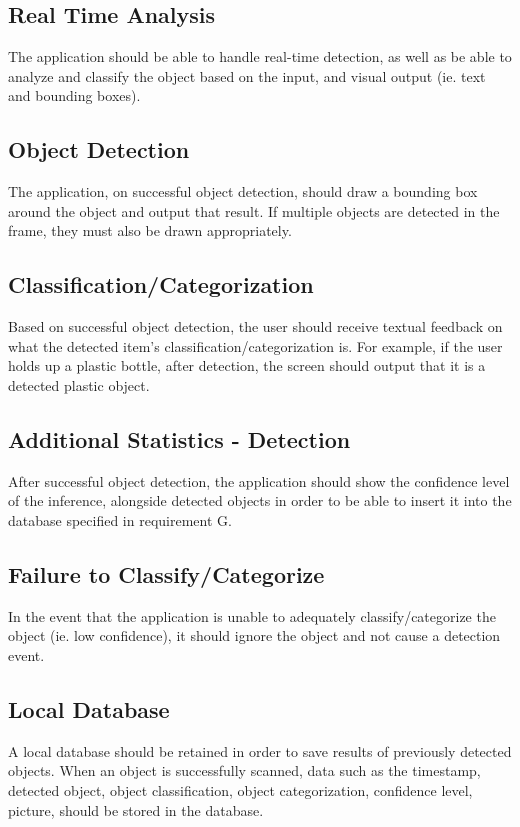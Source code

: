 \documentclass[conference]{IEEEtran}
\begin{document}
\subsection{Real Time Analysis}

The application should be able to handle real-time detection, as well as be able to analyze and classify the object based on the input, and  visual output (ie. text and bounding boxes). 
\newline
\subsection{Object Detection}

The application, on successful object detection, should draw a bounding box around the object and output that result. If multiple objects are detected in the frame, they must also be drawn appropriately.
\newline
\subsection{Classification/Categorization}

Based on successful object detection, the user should receive textual feedback on what the detected item's classification/categorization is. For example, if the user holds up a plastic bottle, after detection, the screen should output that it is a detected plastic object.
\newline
\subsection{Additional Statistics - Detection}

After successful object detection, the application should show the confidence level of the inference, alongside detected objects in order to be able to insert it into the database specified in requirement G.
\newline
\subsection{Failure to Classify/Categorize}

In the event that the application is unable to adequately classify/categorize the object (ie. low confidence), it should ignore the object and not cause a detection event.
\newline
\subsection{Local Database}
A local database should be retained in order to save results of previously detected objects. When an object is successfully scanned, data such as the timestamp, detected object, object classification, object categorization, confidence level, picture, should be stored in the database.
\end{document}
